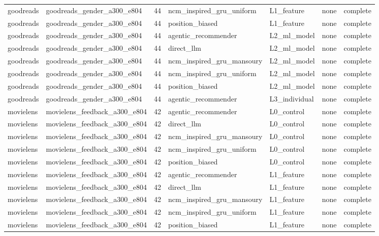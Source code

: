 \begin{table}[htbp!]
\begin{tabular}{llrllll}
goodreads & goodreads\_gender\_a300\_e804 & 44 & ncm\_inspired\_gru\_uniform & L1\_feature & none & complete \\
goodreads & goodreads\_gender\_a300\_e804 & 44 & position\_biased & L1\_feature & none & complete \\
goodreads & goodreads\_gender\_a300\_e804 & 44 & agentic\_recommender & L2\_ml\_model & none & complete \\
goodreads & goodreads\_gender\_a300\_e804 & 44 & direct\_llm & L2\_ml\_model & none & complete \\
goodreads & goodreads\_gender\_a300\_e804 & 44 & ncm\_inspired\_gru\_mansoury & L2\_ml\_model & none & complete \\
goodreads & goodreads\_gender\_a300\_e804 & 44 & ncm\_inspired\_gru\_uniform & L2\_ml\_model & none & complete \\
goodreads & goodreads\_gender\_a300\_e804 & 44 & position\_biased & L2\_ml\_model & none & complete \\
goodreads & goodreads\_gender\_a300\_e804 & 44 & agentic\_recommender & L3\_individual & none & complete \\
movielens & movielens\_feedback\_a300\_e804 & 42 & agentic\_recommender & L0\_control & none & complete \\
movielens & movielens\_feedback\_a300\_e804 & 42 & direct\_llm & L0\_control & none & complete \\
movielens & movielens\_feedback\_a300\_e804 & 42 & ncm\_inspired\_gru\_mansoury & L0\_control & none & complete \\
movielens & movielens\_feedback\_a300\_e804 & 42 & ncm\_inspired\_gru\_uniform & L0\_control & none & complete \\
movielens & movielens\_feedback\_a300\_e804 & 42 & position\_biased & L0\_control & none & complete \\
movielens & movielens\_feedback\_a300\_e804 & 42 & agentic\_recommender & L1\_feature & none & complete \\
movielens & movielens\_feedback\_a300\_e804 & 42 & direct\_llm & L1\_feature & none & complete \\
movielens & movielens\_feedback\_a300\_e804 & 42 & ncm\_inspired\_gru\_mansoury & L1\_feature & none & complete \\
movielens & movielens\_feedback\_a300\_e804 & 42 & ncm\_inspired\_gru\_uniform & L1\_feature & none & complete \\
movielens & movielens\_feedback\_a300\_e804 & 42 & position\_biased & L1\_feature & none & complete \\

\end{tabular}
\end{table}

